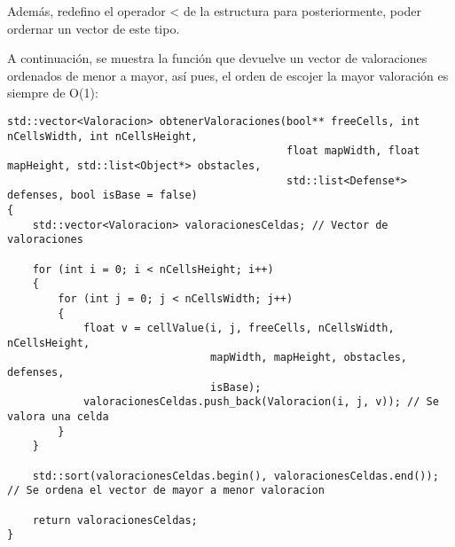 Además, redefino el operador < de la estructura para posteriormente, poder ordernar
un vector de este tipo.

A continuación, se muestra la función que devuelve un vector de valoraciones
ordenados de menor a mayor, así pues, el orden de escojer la mayor valoración
es siempre de O(1):

\lstset{language=C++, texcl=true}
\begin{lstlisting}[frame=single]
std::vector<Valoracion> obtenerValoraciones(bool** freeCells, int nCellsWidth, int nCellsHeight,
                                            float mapWidth, float mapHeight, std::list<Object*> obstacles,
                                            std::list<Defense*> defenses, bool isBase = false)
{
    std::vector<Valoracion> valoracionesCeldas; // Vector de valoraciones

    for (int i = 0; i < nCellsHeight; i++)
    {
        for (int j = 0; j < nCellsWidth; j++)
        {
            float v = cellValue(i, j, freeCells, nCellsWidth, nCellsHeight,
                                mapWidth, mapHeight, obstacles, defenses,
                                isBase);
            valoracionesCeldas.push_back(Valoracion(i, j, v)); // Se valora una celda
        }
    }

    std::sort(valoracionesCeldas.begin(), valoracionesCeldas.end()); // Se ordena el vector de mayor a menor valoracion

    return valoracionesCeldas;
}
\end{lstlisting}
